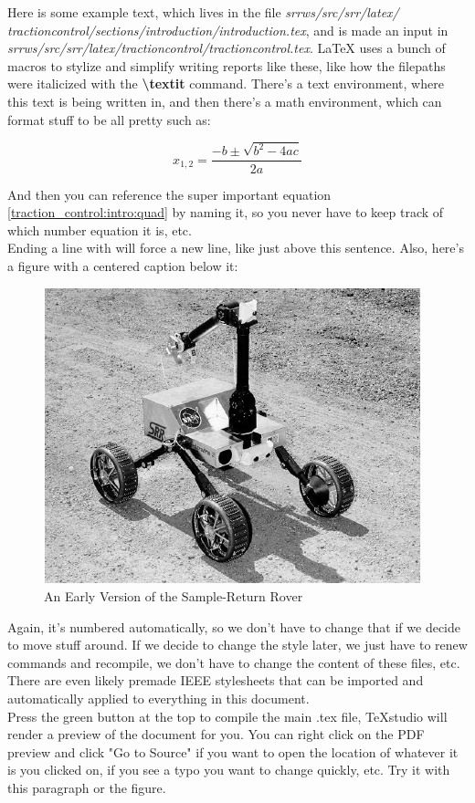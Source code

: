 Here is some example text, which lives in the file \textit{srr\textunderscore ws/src/srr/latex/ traction\textunderscore control/sections/introduction/introduction.tex}, and is made an input in \textit{srr\textunderscore ws/src/srr/latex/traction\textunderscore control/traction\textunderscore control.tex}. LaTeX uses a bunch of macros to stylize and simplify writing reports like these, like how the filepaths were italicized with the \textbf{\textbackslash textit} command. There's a text environment, where this text is being written in, and then there's a math environment, which can format stuff to be all pretty such as:

\begin{equation}\label{traction_control:intro:quad}
	x_{1,2} = \frac{-b \pm \sqrt{b^{2} - 4ac}}{2a}
\end{equation}

And then you can reference the super important equation \eqref{traction_control:intro:quad} by naming it, so you never have to keep track of which number equation it is, etc. \\

Ending a line with \text{\textbackslash \textbackslash} will force a new line, like just above this sentence. Also, here's a figure with a centered caption below it:

\begin{figure}[htbp]
	\centering
	\includegraphics[width=.9\textwidth]{sections/introduction/images/srr.png}
	\caption{An Early Version of the Sample-Return Rover}
\end{figure}

Again, it's numbered automatically, so we don't have to change that if we decide to move stuff around. If we decide to change the style later, we just have to renew commands and recompile, we don't have to change the content of these files, etc. There are even likely premade IEEE stylesheets that can be imported and automatically applied to everything in this document. \\

Press the green button at the top to compile the main .tex file, TeXstudio will render a preview of the document for you. You can right click on the PDF preview and click "Go to Source" if you want to open the location of whatever it is you clicked on, if you see a typo you want to change quickly, etc. Try it with this paragraph or the figure.
